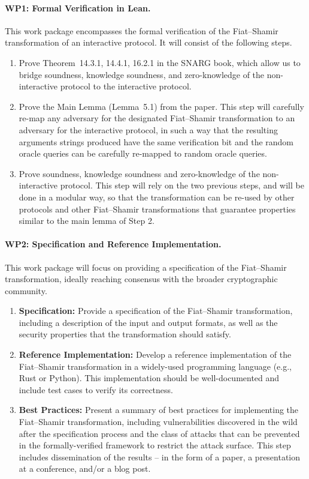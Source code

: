\documentclass{article}
\begin{document}
\paragraph{WP1: Formal Verification in Lean.}
This work package encompasses the formal verification of the Fiat--Shamir transformation of an interactive protocol. It will consist of the following steps.
\begin{enumerate}[label=\textbf{Step \arabic*:}, leftmargin=*, itemsep=0.5em]
    \item Prove Theorem~14.3.1, 14.4.1, 16.2.1 in the SNARG book, which allow us to bridge soundness, knowledge soundness, and zero-knowledge of the non-interactive protocol to the interactive protocol.
    \item Prove the Main Lemma (Lemma~5.1) from the paper. This step will carefully re-map any adversary for the designated Fiat--Shamir transformation to an adversary for the interactive protocol, in such a way that the resulting arguments strings produced have the same verification bit and the random oracle queries can be carefully re-mapped to random oracle queries.
    \item Prove soundness, knowledge soundness and zero-knowledge of the non-interactive protocol. This step will rely on the two previous steps, and will be done in a modular way, so that the transformation can be re-used by other protocols and other Fiat--Shamir transformations that guarantee properties similar to the main lemma of Step 2.
\end{enumerate}
\paragraph{WP2: Specification and Reference Implementation. }
This work package will focus on providing a specification of the Fiat--Shamir transformation, ideally reaching consensus with the broader cryptographic community.
\begin{enumerate}[label=\textbf{Step \arabic*:}, leftmargin=*, itemsep=0.5em]

    \item \textbf{Specification:} Provide a specification of the Fiat--Shamir transformation, including a description of the input and output formats, as well as the security properties that the transformation should satisfy.
    \item \textbf{Reference Implementation:} Develop a reference implementation of the Fiat--Shamir transformation in a widely-used programming language (e.g., Rust or Python). This implementation should be well-documented and include test cases to verify its correctness.
    \item \textbf{Best Practices:} Present a summary of best practices for implementing the Fiat--Shamir transformation, including vulnerabilities discovered in the wild after the specification process and the class of attacks that can be prevented in the formally-verified framework to restrict the attack surface. This step includes dissemination of the results  -- in the form of a paper, a presentation at a conference, and/or a blog post.
\end{enumerate}
\end{document}
